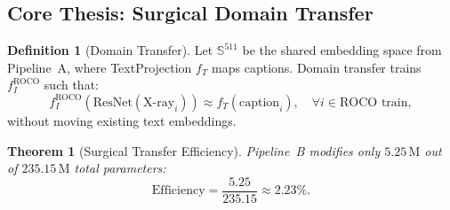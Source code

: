 \documentclass[12pt,a4paper]{article}
\theoremstyle{definition}
\newtheorem{definition}{Definition}[section]
\theoremstyle{plain}
\newtheorem{theorem}{Theorem}[section]
\theoremstyle{remark}
\newcommand{\Sph}{\mathbb{S}}
\begin{document}
\subsection{Core Thesis: Surgical Domain Transfer}

\begin{definition}[Domain Transfer]
Let $\Sph^{511}$ be the shared embedding space from Pipeline~A, where TextProjection $f_T$ maps captions. Domain transfer trains $f_I^{\text{ROCO}}$ such that:
\[
  f_I^{\text{ROCO}}\!\left(\text{ResNet}(\text{X-ray}_i)\right) \approx f_T(\text{caption}_i), \quad \forall i \in \text{ROCO train},
\]
without moving existing text embeddings.
\end{definition}

\begin{theorem}[Surgical Transfer Efficiency]
\label{thm:efficiency}
Pipeline~B modifies only $5.25\,\text{M}$ out of $235.15\,\text{M}$ total parameters:
\[
  \text{Efficiency} = \frac{5.25}{235.15} \approx 2.23\%.
\]
\end{theorem}
\end{document}
